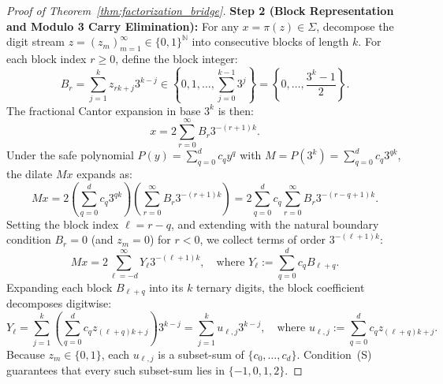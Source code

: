 \documentclass[11pt,reqno]{amsart}
\theoremstyle{plain}
\theoremstyle{definition}
\theoremstyle{remark}
\newcommand{\N}{\mathbb{N}}
\begin{document}
\begin{proof}[Proof of Theorem~\ref{thm:factorization_bridge}]
\textbf{Step 2 (Block Representation and Modulo 3 Carry Elimination):}
For any $x = \pi(z) \in \Sigma$, decompose the digit stream $z = (z_m)_{m=1}^\infty \in \{0, 1\}^\N$ into consecutive blocks of length $k$. For each block index $r \ge 0$, define the block integer:
\begin{equation}
B_r = \sum_{j=1}^k z_{rk+j} 3^{k-j} \in \left\{0, 1, \dots, \sum_{j=0}^{k-1} 3^j\right\} = \left\{0, \dots, \frac{3^k - 1}{2}\right\}.
\end{equation}
The fractional Cantor expansion in base $3^k$ is then:
\begin{equation}
x = 2 \sum_{r=0}^\infty B_r 3^{-(r+1)k}.
\end{equation}
Under the safe polynomial $P(y) = \sum_{q=0}^d c_q y^q$ with $M = P(3^k) = \sum_{q=0}^d c_q 3^{qk}$, the dilate $M x$ expands as:
\begin{equation}
M x = 2 \left( \sum_{q=0}^d c_q 3^{qk} \right) \left( \sum_{r=0}^\infty B_r 3^{-(r+1)k} \right) = 2 \sum_{q=0}^d c_q \sum_{r=0}^\infty B_r 3^{-(r-q+1)k}.
\end{equation}
Setting the block index $\ell = r - q$, and extending with the natural boundary condition $B_r = 0$ (and $z_m = 0$) for $r < 0$, we collect terms of order $3^{-(\ell+1)k}$:
\begin{equation}
M x = 2 \sum_{\ell = -d}^\infty Y_\ell 3^{-(\ell+1)k}, \quad \text{where } Y_\ell := \sum_{q=0}^d c_q B_{\ell+q}.
\end{equation}
Expanding each block $B_{\ell+q}$ into its $k$ ternary digits, the block coefficient decomposes digitwise:
\begin{equation}
Y_\ell = \sum_{j=1}^k \left( \sum_{q=0}^d c_q z_{(\ell+q)k+j} \right) 3^{k-j} = \sum_{j=1}^k u_{\ell, j} 3^{k-j}, \quad \text{where } u_{\ell, j} := \sum_{q=0}^d c_q z_{(\ell+q)k+j}.
\end{equation}
Because $z_m \in \{0, 1\}$, each $u_{\ell, j}$ is a subset-sum of $\{c_0, \dots, c_d\}$. Condition~(S) guarantees that every such subset-sum lies in $\{-1, 0, 1, 2\}$.


\end{proof}
\end{document}
